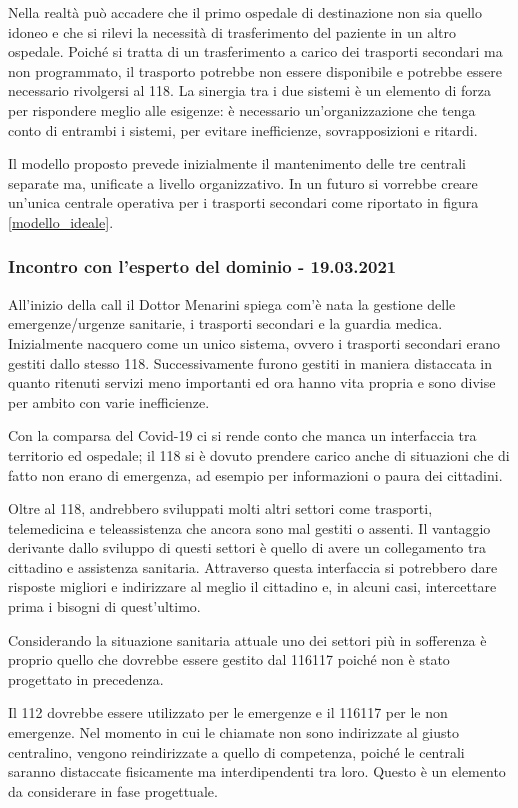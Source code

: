 \documentclass[12pt]{article}
\begin{document}
Nella realtà può accadere che il primo ospedale di destinazione non sia quello idoneo e che si rilevi la necessità di trasferimento del paziente in un altro ospedale. Poiché si tratta di un trasferimento a carico dei trasporti secondari ma non programmato, il trasporto potrebbe non essere disponibile e potrebbe essere necessario rivolgersi al 118. La sinergia tra i due sistemi è un elemento di forza per rispondere meglio alle esigenze: è necessario un'organizzazione che tenga conto di entrambi i sistemi, per evitare inefficienze, sovrapposizioni e ritardi.

Il modello proposto prevede inizialmente il mantenimento delle tre centrali separate ma, unificate a livello organizzativo. In un futuro si vorrebbe creare un'unica centrale operativa per i trasporti secondari come riportato in figura \ref{modello_ideale}.

\subsubsection{Incontro con l'esperto del dominio - 19.03.2021}
All'inizio della call il Dottor Menarini spiega com'è nata la gestione delle emergenze/urgenze sanitarie, i trasporti secondari e la guardia medica. Inizialmente nacquero come un unico sistema, ovvero i trasporti secondari erano gestiti dallo stesso 118. Successivamente furono gestiti in maniera distaccata in quanto ritenuti servizi meno importanti ed ora hanno vita propria e sono divise per ambito con varie inefficienze. 

Con la comparsa del Covid-19 ci si rende conto che manca un interfaccia tra territorio ed ospedale; il 118 si è dovuto prendere carico anche di situazioni che di fatto non erano di emergenza, ad esempio per informazioni o paura dei cittadini.

Oltre al 118, andrebbero sviluppati molti altri settori come trasporti, telemedicina e teleassistenza che ancora sono mal gestiti o assenti.
Il vantaggio derivante dallo sviluppo di questi settori è quello di avere un collegamento tra cittadino e assistenza sanitaria. Attraverso questa interfaccia si potrebbero dare risposte migliori e indirizzare al meglio il cittadino e, in alcuni casi, intercettare prima i bisogni di quest'ultimo. 

Considerando la situazione sanitaria attuale uno dei settori più in sofferenza è proprio quello che dovrebbe essere gestito dal 116117 poiché non è stato progettato in precedenza.

Il 112 dovrebbe essere utilizzato per le emergenze e il 116117 per le non emergenze. 
Nel momento in cui le chiamate non sono indirizzate al giusto centralino, vengono reindirizzate a quello di competenza, poiché le centrali saranno distaccate fisicamente ma interdipendenti tra loro. Questo è un elemento da considerare in fase progettuale. 
\end{document}
